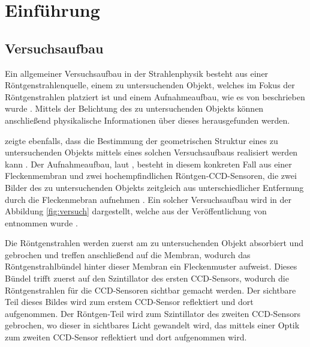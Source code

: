 \section{Einführung}

\subsection{Versuchsaufbau}

Ein allgemeiner Versuchsaufbau in der Strahlenphysik besteht aus einer Röntgenstrahlenquelle, einem zu untersuchenden Objekt, welches im Fokus der Röntgenstrahlen platziert ist und einem Aufnahmeaufbau, wie es von \citeauthor{Ber13} beschrieben wurde . Mittels der Belichtung des zu untersuchenden Objekts können anschließend physikalische Informationen über dieses herausgefunden werden.

\citeauthor{Ber13} zeigte ebenfalls, dass die Bestimmung der geometrischen Struktur eines zu untersuchenden Objekts mittels eines solchen Versuchsaufbaus realisiert werden kann . Der Aufnahmeaufbau, laut \citeauthor{Ber15}, besteht in diesem konkreten Fall aus einer Fleckenmembran und zwei hochempfindlichen Röntgen-\gls{CCD}-Sensoren, die zwei Bilder des zu untersuchenden Objekts zeitgleich aus unterschiedlicher Entfernung durch die Fleckenmebran aufnehmen . Ein solcher Versuchsaufbau wird in der Abbildung \ref{fig:versuch} dargestellt, welche aus der Veröffentlichung \cite{Ber15} von \citeauthor{Ber15} entnommen wurde \cite{Ber15}.

Die Röntgenstrahlen werden zuerst am zu untersuchenden Objekt absorbiert und gebrochen und treffen anschließend auf die Membran, wodurch das Röntgenstrahlbündel hinter dieser Membran ein Fleckenmuster aufweist. Dieses Bündel trifft zuerst auf den Szintillator des ersten \gls{CCD}-Sensors, wodurch die Röntgenstrahlen für die \gls{CCD}-Sensoren sichtbar gemacht werden. Der sichtbare Teil dieses Bildes wird zum erstem \gls{CCD}-Sensor reflektiert und dort aufgenommen. Der Röntgen-Teil wird zum Szintillator des zweiten \gls{CCD}-Sensors gebrochen, wo dieser in sichtbares Licht gewandelt wird, das mittels einer Optik zum zweiten \gls{CCD}-Sensor reflektiert und dort aufgenommen wird. 

